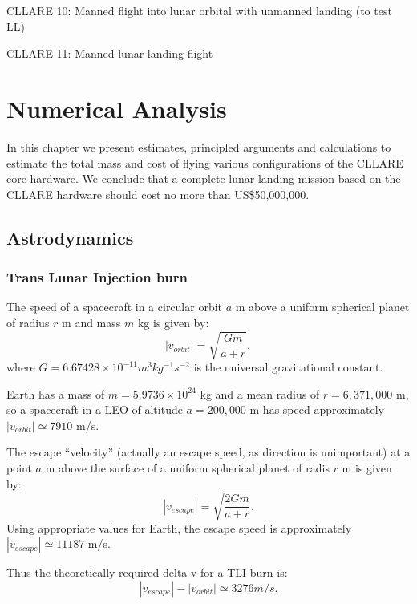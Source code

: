 \documentclass{report}
\begin{document}
CLLARE 10: Manned flight into lunar orbital with unmanned landing (to test LL)

CLLARE 11: Manned lunar landing flight


\chapter{Numerical Analysis} \label{chap:numeric}

In this chapter we present estimates, principled arguments and calculations to estimate the total mass and cost of flying various configurations of the CLLARE core hardware.  We conclude that a complete lunar landing mission based on the CLLARE hardware should cost no more than US\$50,000,000.

\section{Astrodynamics}

\subsection{Trans Lunar Injection burn} \label{sec:tli}

The speed of a spacecraft in a circular orbit $a$ m above a uniform spherical planet of radius $r$ m and mass $m$ kg is given by:
\begin{equation} \label{eq:v_orbit}
|v_{orbit}| = \sqrt{\frac{Gm}{a+r}},
\end{equation}
where $G = 6.67428 \times 10^{-11} m^3 kg^{-1} s^{-2}$ is the universal gravitational constant.

Earth has a mass of $m = 5.9736 \times 10^{24}$ kg and a mean radius of $r = 6,371,000$ m, so a spacecraft in a LEO of altitude $a = 200,000$ m has speed approximately $|v_{orbit}| \simeq 7910$ m/s.

The escape ``velocity'' (actually an escape speed, as direction is unimportant) at a point $a$ m above the surface of a uniform spherical planet of radis $r$ m is given by:
\begin{equation} \label{eq:v_escape}
|v_{escape}| = \sqrt{\frac{2Gm}{a+r}}.
\end{equation}
Using appropriate values for Earth, the escape speed is approximately $|v_{escape}| \simeq 11187$ m/s.

Thus the theoretically required delta-v for a TLI burn is:
\begin{equation}
|v_{escape}| - |v_{orbit}| \simeq 3276 m/s.
\end{equation}
\end{document}
